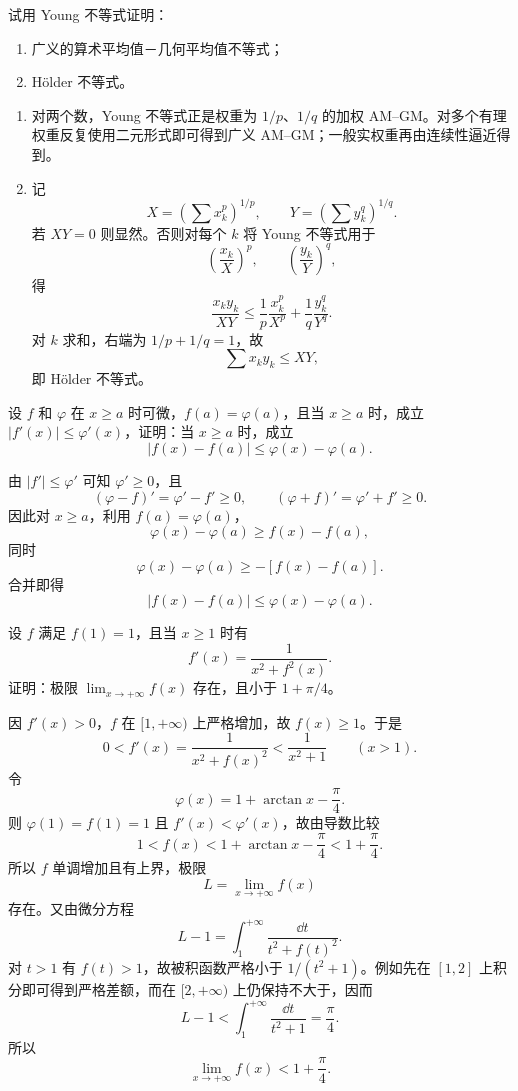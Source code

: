 \begin{xexercise}[11]
试用 Young 不等式证明：
  \begin{enumerate}[label=(\arabic*)]
    \item 广义的算术平均值－几何平均值不等式；
    \item Hölder 不等式。
  \end{enumerate}
\end{xexercise}
\begin{xsolution}
\begin{enumerate}[label=(\arabic*)]
  \item 对两个数，Young 不等式正是权重为 $1/p$、$1/q$ 的加权 AM--GM。对多个有理权重反复使用二元形式即可得到广义 AM--GM；一般实权重再由连续性逼近得到。

  \item 记
  \[
    X=\left(\sum x_k^p\right)^{1/p},
    \qquad
    Y=\left(\sum y_k^q\right)^{1/q}.
  \]
  若 $XY=0$ 则显然。否则对每个 $k$ 将 Young 不等式用于
  \[
    \left(\frac{x_k}{X}\right)^p,
    \qquad
    \left(\frac{y_k}{Y}\right)^q,
  \]
  得
  \[
    \frac{x_ky_k}{XY}
    \le\frac1p\frac{x_k^p}{X^p}
       +\frac1q\frac{y_k^q}{Y^q}.
  \]
  对 $k$ 求和，右端为 $1/p+1/q=1$，故
  \[
    \sum x_ky_k\le XY,
  \]
  即 Hölder 不等式。
\end{enumerate}
\end{xsolution}


\begin{xexercise}[12]
设 $f$ 和 $\varphi$ 在 $x\ge a$ 时可微，$f(a)=\varphi(a)$，且当 $x\ge a$ 时，成立 $|f'(x)|\le\varphi'(x)$，证明：当 $x\ge a$ 时，成立
  \[
    |f(x)-f(a)|\le\varphi(x)-\varphi(a).
  \]
\end{xexercise}
\begin{xsolution}
由 $|f'|\le\varphi'$ 可知 $\varphi'\ge0$，且
\[
  (\varphi-f)'=\varphi'-f'\ge0,
  \qquad
  (\varphi+f)'=\varphi'+f'\ge0.
\]
因此对 $x\ge a$，利用 $f(a)=\varphi(a)$，
\[
  \varphi(x)-\varphi(a)\ge f(x)-f(a),
\]
同时
\[
  \varphi(x)-\varphi(a)\ge-[f(x)-f(a)].
\]
合并即得
\[
  |f(x)-f(a)|\le\varphi(x)-\varphi(a).
\]
\end{xsolution}


\begin{xexercise}[13]
设 $f$ 满足 $f(1)=1$，且当 $x\ge1$ 时有
  \[
    f'(x)=\frac1{x^2+f^2(x)}.
  \]
  证明：极限 $\displaystyle\lim_{x\to+\infty}f(x)$ 存在，且小于 $1+\pi/4$。
\end{xexercise}
\begin{xsolution}
因 $f'(x)>0$，$f$ 在 $[1,+\infty)$ 上严格增加，故 $f(x)\ge1$。于是
\[
  0<f'(x)=\frac1{x^2+f(x)^2}<\frac1{x^2+1}\qquad(x>1).
\]
令
\[
  \varphi(x)=1+\arctan x-\frac\pi4.
\]
则 $\varphi(1)=f(1)=1$ 且 $f'(x)<\varphi'(x)$，故由导数比较
\[
  1<f(x)<1+\arctan x-\frac\pi4<1+\frac\pi4.
\]
所以 $f$ 单调增加且有上界，极限
\[
  L=\lim_{x\to+\infty}f(x)
\]
存在。又由微分方程
\[
  L-1
  =\int_1^{+\infty}\frac{\dd t}{t^2+f(t)^2}.
\]
对 $t>1$ 有 $f(t)>1$，故被积函数严格小于 $1/(t^2+1)$。例如先在 $[1,2]$ 上积分即可得到严格差额，而在 $[2,+\infty)$ 上仍保持不大于，因而
\[
  L-1
  <\int_1^{+\infty}\frac{\dd t}{t^2+1}
  =\frac\pi4.
\]
所以
\[
  \boxed{\displaystyle\lim_{x\to+\infty}f(x)<1+\frac\pi4}.
\]
\end{xsolution}


